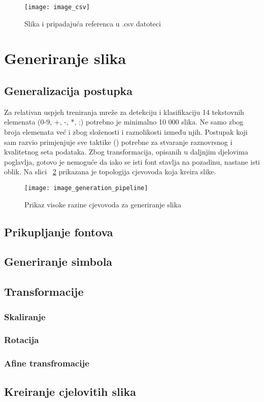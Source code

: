 \begin{figure}[h!]
	\centering
	\texttt{[image: image\_csv]}
	 \caption{Slika i pripadajuća referenca u .csv datoteci}
 	 \label{fig:pipelineExitExample}
\end{figure}

\section{Generiranje slika}
\subsection{Generalizacija postupka}
Za relativan uspjeh treniranja mreže za detekciju i klasifikaciju 14 tekstovnih elemenata (0-9, +, -, *, :) potrebno je minimalno 10 000 slika. Ne samo zbog broja elemenata već i zbog složenosti i raznolikosti između njih. 
Postupak koji sam razvio primjenjuje sve taktike (\cite{chollet2017deep}) potrebne za stvaranje raznovrsnog i kvalitetnog seta podataka.
Zbog transformacija, opisanih u daljnjim djelovima poglavlja, gotovo je nemoguće da iako se isti font stavlja na pozadinu, nastane isti oblik.
Na slici ~\ref{fig:imageGenerationPipeline} prikazana je topologija cjevovoda koja kreira slike.

\begin{figure}[h!]
	\centering
	\texttt{[image: image\_generation\_pipeline]}
	 \caption{Prikaz visoke razine cjevovoda za generiranje slika}
 	 \label{fig:imageGenerationPipeline}
\end{figure}
\subsection{Prikupljanje fontova}

\subsection{Generiranje simbola}

\subsection{Transformacije}
\subsubsection{Skaliranje}
\subsubsection{Rotacija}
\subsubsection{Afine transfromacije}

\subsection{Kreiranje cjelovitih slika}

